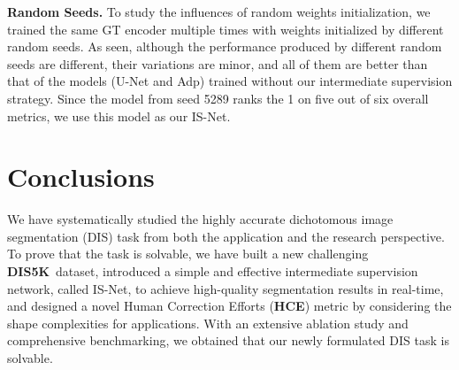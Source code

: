 \documentclass[10pt,twocolumn,letterpaper]{article}
\def\ourmodel{IS-Net}
\def \ourdataset{DIS5K}
\begin{document}
\noindent\textbf{Random Seeds.}
To study the influences of random weights initialization, we trained the same GT encoder multiple times with weights initialized by different random seeds. 
As seen, although the performance produced by different random seeds are different, 
their variations are minor, and all of them are better than that of the models (U-Net and Adp) trained without our intermediate supervision strategy. Since the model from seed 5289 ranks the 1 on five out of six overall metrics, we use this model as our \ourmodel. 


\section{Conclusions}
We have systematically studied the highly accurate dichotomous image segmentation (DIS) task from both the application and the research perspective. To prove that the task is solvable, we have built a new challenging \textbf{\ourdataset}~dataset, introduced a simple and effective intermediate supervision network, called \ourmodel, to achieve high-quality segmentation results in real-time, and designed a novel Human Correction Efforts (\textbf{HCE}) metric by considering the shape complexities for applications.
With an extensive ablation study and comprehensive benchmarking, we obtained that our newly formulated DIS task is solvable. 
\end{document}
